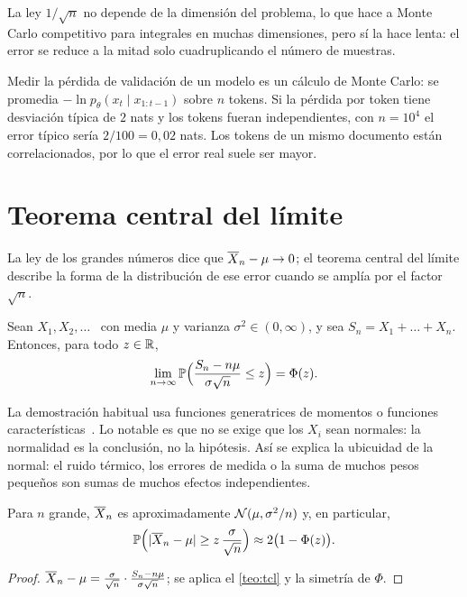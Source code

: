 La ley $1/\sqrt n$ no depende de la dimensión del problema, lo que hace a Monte Carlo competitivo para integrales en muchas dimensiones, pero sí la hace lenta: el error se reduce a la mitad solo cuadruplicando el número de muestras.

\begin{observacion}
Medir la pérdida de validación de un modelo es un cálculo de Monte Carlo: se promedia $-\ln p_\theta(x_t\mid x_{1:t-1})$ sobre $n$ tokens. Si la pérdida por token tiene desviación típica de $2$ nats y los tokens fueran independientes, con $n=10^{4}$ el error típico sería $2/100=0{,}02$ nats. Los tokens de un mismo documento están correlacionados, por lo que el error real suele ser mayor.
\end{observacion}

\section{Teorema central del límite}

La ley de los grandes números dice que $\overline{X}_n-\mu\to 0$; el teorema central del límite describe la forma de la distribución de ese error cuando se amplía por el factor $\sqrt n$.

\begin{teorema}\label{teo:tcl}
Sean $X_1,X_2,\dots$ \iid\ con media $\mu$ y varianza $\sigma^{2}\in(0,\infty)$, y sea $S_n=X_1+\dots+X_n$. Entonces, para todo $z\in\mathbb{R}$,
\[
\lim_{n\to\infty}\mathbb{P}\Bigl(\frac{S_n-n\mu}{\sigma\sqrt n}\le z\Bigr)=\Phi(z).
\]
\end{teorema}

La demostración habitual usa funciones generatrices de momentos o funciones características~\cite[§5.4]{bt}. Lo notable es que no se exige que los $X_i$ sean normales: la normalidad es la conclusión, no la hipótesis. Así se explica la ubicuidad de la normal: el ruido térmico, los errores de medida o la suma de muchos pesos pequeños son sumas de muchos efectos independientes.

\begin{corolario}\label{cor:aprox}
Para $n$ grande, $\overline{X}_n$ es aproximadamente $\mathcal{N}(\mu,\sigma^{2}/n)$ y, en particular,
\[
\mathbb{P}\Bigl(\lvert\overline{X}_n-\mu\rvert\ge z\,\frac{\sigma}{\sqrt n}\Bigr)\approx 2\bigl(1-\Phi(z)\bigr).
\]
\end{corolario}

\begin{proof}
$\overline{X}_n-\mu=\frac{\sigma}{\sqrt n}\cdot\frac{S_n-n\mu}{\sigma\sqrt n}$; se aplica el \cref{teo:tcl} y la simetría de $\Phi$.
\end{proof}

